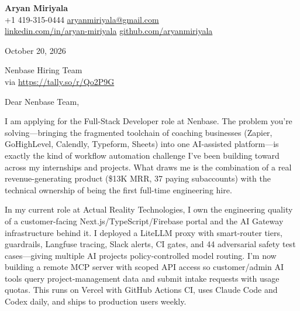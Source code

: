 \documentclass[letterpaper,11pt]{article}
\begin{document}
\begin{flushleft}
\textbf{Aryan Miriyala}\\
+1 419-315-0444 \textbar{} \href{mailto:aryanmiriyala@gmail.com}{aryanmiriyala@gmail.com}\\
\href{https://www.linkedin.com/in/aryan-miriyala-7788a21b6/}{linkedin.com/in/aryan-miriyala} \textbar{} \href{https://github.com/aryanmiriyala}{github.com/aryanmiriyala}
\end{flushleft}

\vspace{10pt}

\begin{flushleft}
October 20, 2026
\end{flushleft}

\vspace{10pt}

\begin{flushleft}
Nenbase Hiring Team\\
via \href{https://tally.so/r/Qo2P9G}{https://tally.so/r/Qo2P9G}
\end{flushleft}

\vspace{14pt}

Dear Nenbase Team,

\vspace{6pt}

I am applying for the Full-Stack Developer role at Nenbase. The problem you're solving---bringing the fragmented toolchain of coaching businesses (Zapier, GoHighLevel, Calendly, Typeform, Sheets) into one AI-assisted platform---is exactly the kind of workflow automation challenge I've been building toward across my internships and projects. What draws me is the combination of a real revenue-generating product (\$13K MRR, 37 paying subaccounts) with the technical ownership of being the first full-time engineering hire.

\vspace{6pt}

In my current role at Actual Reality Technologies, I own the engineering quality of a customer-facing Next.js/TypeScript/Firebase portal and the AI Gateway infrastructure behind it. I deployed a LiteLLM proxy with smart-router tiers, guardrails, Langfuse tracing, Slack alerts, CI gates, and 44 adversarial safety test cases---giving multiple AI projects policy-controlled model routing. I'm now building a remote MCP server with scoped API access so customer/admin AI tools query project-management data and submit intake requests with usage quotas. This runs on Vercel with GitHub Actions CI, uses Claude Code and Codex daily, and ships to production users weekly.
\end{document}
